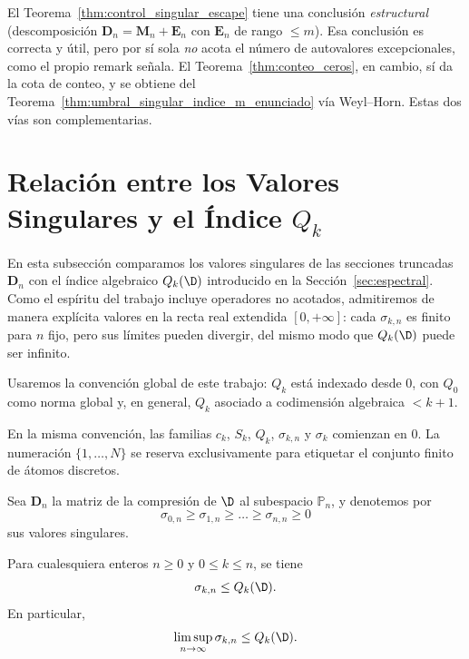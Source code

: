 \begin{rmk}\label{rem:weyl_horn_vs_control}
	El Teorema~\ref{thm:control_singular_escape} tiene una conclusión
	\emph{estructural} (descomposición $\mathbf D_n=\mathbf M_n+\mathbf E_n$
	con $\mathbf E_n$ de rango $\le m$). Esa conclusión es correcta y útil,
	pero por sí sola \emph{no} acota el número de autovalores excepcionales,
	como el propio remark señala. El Teorema~\ref{thm:conteo_ceros},
	en cambio, sí da la cota de conteo, y se obtiene del Teorema~\ref{thm:umbral_singular_indice_m_enunciado}
	vía Weyl--Horn. Estas dos vías son complementarias.
\end{rmk}

\section{Relación entre los Valores Singulares y el Índice $Q_k$}

En esta subsección comparamos los valores singulares de las secciones truncadas $\mathbf{D}_n$ con el índice algebraico $Q_k(\D)$ introducido en la Sección~\ref{sec:espectral}. Como el espíritu del trabajo incluye operadores no acotados, admitiremos de manera explícita valores en la recta real extendida $[0,+\infty]$: cada $\sigma_{k,n}$ es finito para $n$ fijo, pero sus límites pueden divergir, del mismo modo que $Q_k(\D)$ puede ser infinito.

Usaremos la convención global de este trabajo: $Q_k$ está indexado desde $0$, con $Q_0$ como norma global y, en general, $Q_k$ asociado a codimensión algebraica $<k+1$.

En la misma convención, las familias $c_k$, $S_k$, $Q_k$, $\sigma_{k,n}$ y $\sigma_k$ comienzan en $0$. La numeración $\{1,\dots,N\}$ se reserva exclusivamente para etiquetar el conjunto finito de átomos discretos.

Sea $\mathbf{D}_n$ la matriz de la compresión de $\D$ al subespacio $\mathbb{P}_{n}$, y denotemos por
\[
	\sigma_{0,n} \ge \sigma_{1,n} \ge \dots \ge \sigma_{n,n} \ge 0
\]
sus valores singulares.

\begin{prop}\label{prop:sigma_qk}
	Para cualesquiera enteros $n \ge 0$ y $0 \le k \le n$, se tiene
	\[
		\sigma_{k,n} \le Q_k(\D).
	\]
	En particular,
	\[
		\limsup_{n \to \infty} \sigma_{k,n} \le Q_k(\D).
	\]
\end{prop}


